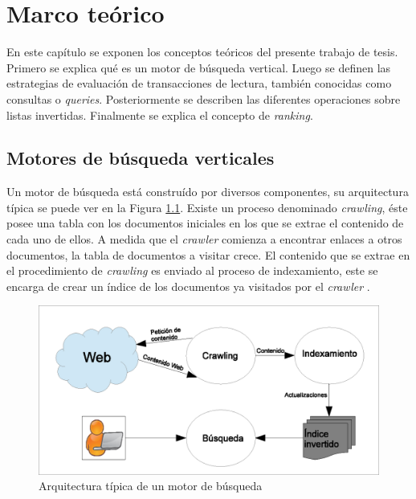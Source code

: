 \chapter{Marco te\'orico}
\label{cap:marco}
En este capítulo se exponen los conceptos teóricos del presente trabajo de tesis. Primero se explica qué es un motor de búsqueda vertical. Luego se definen las estrategias de evaluación de transacciones de lectura, también conocidas como consultas o \textit{queries}. Posteriormente se describen las diferentes operaciones sobre listas invertidas. Finalmente se explica el concepto de \textit{ranking}. 

\section{Motores de búsqueda verticales}
\label{marco:mbv}
Un motor de búsqueda está construído por diversos componentes, su arquitectura típica se puede ver en la Figura \ref{fig:searchenginearchitecture}. Existe un proceso denominado \textit{crawling}, éste posee una tabla con los documentos iniciales en los que se extrae el contenido de cada uno de ellos. A medida que el \textit{crawler} comienza a encontrar enlaces a otros documentos, la tabla de documentos a visitar crece. El contenido que se extrae en el procedimiento de \textit{crawling} es enviado al proceso de indexamiento, este se encarga de crear un índice de los documentos ya visitados por el \textit{crawler} \citep{Croft:2009}.

\begin{figure}[!th]
\centering
\includegraphics[scale=.75]{images/searchenginearchitecture.eps}
\caption{Arquitectura típica de un motor de búsqueda}
\label{fig:searchenginearchitecture}
\end{figure}

